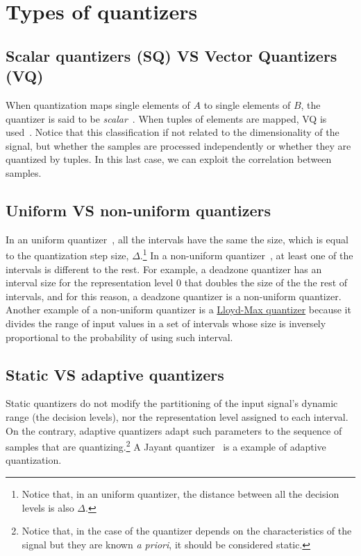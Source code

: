 \section{Types of quantizers}

\subsection{Scalar quantizers (SQ) VS Vector Quantizers (VQ)}

When quantization maps single elements of $A$ to single elements of
$B$, the quantizer is said to be
\emph{scalar}~\cite{vruiz__scalar_quantization}. When tuples of
elements are mapped, VQ is
used~\cite{vruiz__vector_quantization}. Notice that this
classification if not related to the dimensionality of the signal, but
whether the samples are processed independently or whether they are
quantized by tuples. In this last case, we can exploit the correlation
between samples.

\subsection{Uniform VS non-uniform quantizers}

In an uniform quantizer~\cite{vruiz__scalar_quantization}, all the
intervals have the same the size, which is equal to the quantization
step size, $\Delta$.\footnote{Notice that, in an uniform quantizer,
  the distance between all the decision levels is also $\Delta$.} In a
non-uniform quantizer~\cite{vruiz__scalar_quantization}, at least one
of the intervals is different to the rest. For example, a deadzone
quantizer \cite{vruiz__scalar_quantization} has an interval size for
the representation level 0 that doubles the size of the the rest of
intervals, and for this reason, a deadzone quantizer is a non-uniform
quantizer. Another example of a non-uniform quantizer is a
\href{https://en.wikipedia.org/wiki/Lloyd%27s_algorithm}{Lloyd-Max
  quantizer} \cite{vruiz__scalar_quantization} because it divides the
range of input values in a set of intervals whose size is inversely
proportional to the probability of using such interval.

\subsection{Static VS adaptive quantizers}

Static quantizers do not modify the partitioning of the input signal's
dynamic range (the decision levels), nor the representation level
assigned to each interval. On the contrary, adaptive quantizers adapt
such parameters to the sequence of samples that are
quantizing.\footnote{Notice that, in the case of the quantizer depends
  on the characteristics of the signal but they are known \emph{a
    priori}, it should be considered static.} A Jayant
quantizer~\cite{vruiz__scalar_quantization} is a example of adaptive
quantization.

